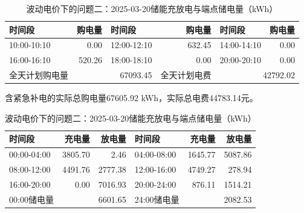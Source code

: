 \begin{table}[H]\centering\small\setlength{\tabcolsep}{5pt}
\caption{波动电价下的问题二：2025-03-20购电结果（电量：kWh；费用：元）}
\begin{tabular}{lrlrlr}\toprule
时间段 & 购电量 & 时间段 & 购电量 & 时间段 & 购电量 \\\midrule
10:00-10:10 & 0.00 & 12:00-12:10 & 632.45 & 14:00-14:10 & 0.00\\
16:00-16:10 & 520.26 & 18:00-18:10 & 0.00 & 20:00-20:10 & 0.00\\
\midrule 全天计划购电量 & \multicolumn{2}{r}{67093.45} & 全天计划电费 & \multicolumn{2}{r}{42792.02}\\\bottomrule
\end{tabular}
\par\vspace{2pt}\footnotesize
含紧急补电的实际总购电量67605.92 kWh，实际总电费44783.14元。
\vspace{3pt}\small
\caption{波动电价下的问题二：2025-03-20储能充放电与端点储电量（kWh）}
\begin{tabular}{lrrlrr}\toprule
时间段 & 充电量 & 放电量 & 时间段 & 充电量 & 放电量 \\\midrule
00:00-04:00 & 3805.70 & 2.46 & 04:00-08:00 & 1645.77 & 5087.86\\
08:00-12:00 & 4491.76 & 2777.38 & 12:00-16:00 & 4749.27 & 278.94\\
16:00-20:00 & 0.00 & 7016.93 & 20:00-24:00 & 876.11 & 1514.21\\
\midrule 00:00储电量 & \multicolumn{2}{r}{6601.65} & 24:00储电量 & \multicolumn{2}{r}{2082.53}\\\bottomrule
\end{tabular}\end{table}
